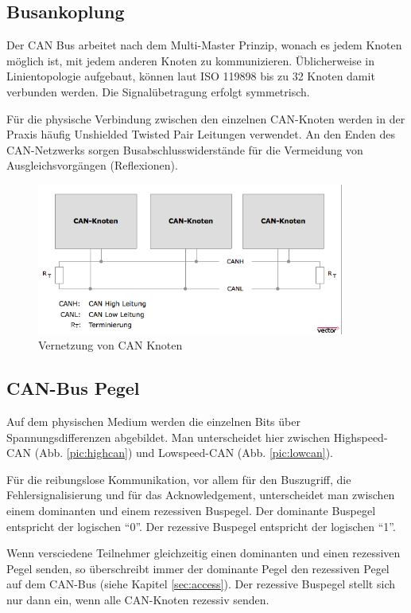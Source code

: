\subsection{Busankoplung}

Der CAN Bus arbeitet nach dem Multi-Master Prinzip, wonach es jedem Knoten 
möglich ist, mit jedem anderen Knoten zu kommunizieren. Üblicherweise in 
Linientopologie aufgebaut, können laut ISO 119898 bis zu 32 Knoten damit
verbunden werden. Die Signalübetragung erfolgt symmetrisch.

Für die physische Verbindung zwischen den einzelnen CAN-Knoten werden in der Praxis
häufig Unshielded Twisted Pair Leitungen verwendet. An den Enden des CAN-Netzwerks 
sorgen Busabschlusswiderstände für die Vermeidung von Ausgleichsvorgängen (Reflexionen).

\begin{figure}[h] 
\centering
\includegraphics[width=0.9\textwidth]{figures/cannet}
\caption{Vernetzung von CAN Knoten \citep{VEC}} 
\label{pic:cannet}
\end{figure}

\subsection{CAN-Bus Pegel} 

Auf dem physischen Medium werden die einzelnen Bits über Spannungsdifferenzen
abgebildet. Man unterscheidet hier zwischen Highspeed-CAN (Abb. \ref{pic:highcan}) 
und Lowspeed-CAN (Abb. \ref{pic:lowcan}).

Für die reibungslose Kommunikation, vor allem für den Buszugriff, die Fehlersignalisierung 
und für das Acknowledgement, unterscheidet man zwischen einem dominanten und einem 
rezessiven Buspegel. Der dominante Buspegel entspricht der logischen ``0''. Der rezessive 
Buspegel entspricht der logischen ``1''. 

Wenn versciedene Teilnehmer gleichzeitig einen dominanten und einen rezessiven Pegel senden, 
so überschreibt immer der dominante Pegel den rezessiven Pegel auf dem CAN-Bus (siehe 
Kapitel \ref{sec:access}). Der rezessive Buspegel stellt sich nur dann ein, wenn alle CAN-Knoten 
rezessiv senden. 

